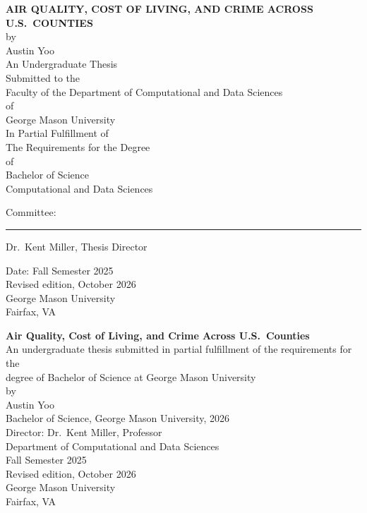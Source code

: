 \documentclass[12pt,letterpaper]{report}
\begin{document}

\begin{titlepage}
\centering
\vspace*{0.5in}
{\large\bfseries AIR QUALITY, COST OF LIVING, AND CRIME ACROSS U.S.\ COUNTIES}\\[1.5em]
by\\[0.5em]
Austin Yoo\\[1.5em]
An Undergraduate Thesis\\
Submitted to the\\
Faculty of the Department of Computational and Data Sciences\\
of\\
George Mason University\\
In Partial Fulfillment of\\
The Requirements for the Degree\\
of\\
Bachelor of Science\\
Computational and Data Sciences\\[2em]
\begin{flushleft}
\hspace{0.5in}Committee:\\[0.8em]
\hspace{0.5in}\rule{2.2in}{0.4pt}\hspace{0.2in}Dr.\ Kent Miller, Thesis Director\\[0.8em]
\end{flushleft}
\vspace{1em}
Date: Fall Semester 2025\\
Revised edition, October 2026\\[1.5em]
George Mason University\\
Fairfax, VA
\end{titlepage}

\thispagestyle{empty}
\begin{center}
{\bfseries Air Quality, Cost of Living, and Crime Across U.S.\ Counties}\\[1em]
An undergraduate thesis submitted in partial fulfillment of the requirements for the\\
degree of Bachelor of Science at George Mason University\\[1.5em]
by\\[0.5em]
Austin Yoo\\
Bachelor of Science, George Mason University, 2026\\[2em]
Director: Dr.\ Kent Miller, Professor\\
Department of Computational and Data Sciences\\[2em]
Fall Semester 2025\\
Revised edition, October 2026\\
George Mason University\\
Fairfax, VA
\end{center}
\clearpage
\end{document}
